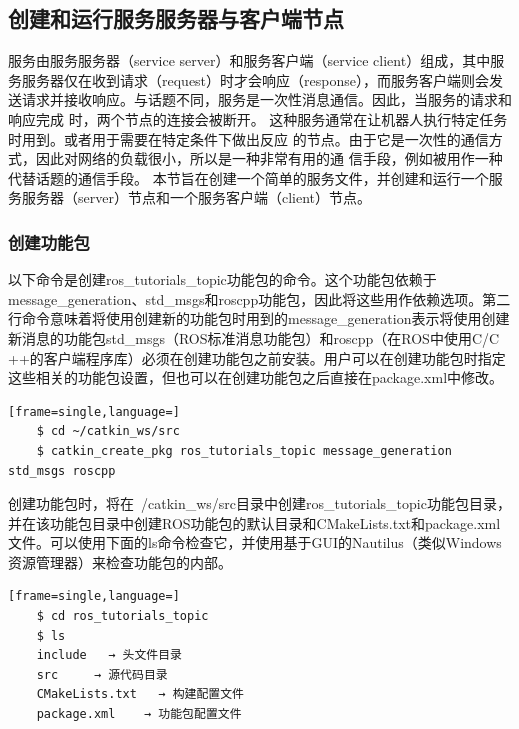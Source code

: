 \documentclass[geye,green,kindle,cn]{elegantnote}
\begin{document}
\subsection{创建和运行服务服务器与客户端节点}
服务由服务服务器（service server）和服务客户端（service client）组成，其中服务服务器仅在收到请求（request）时才会响应（response），而服务客户端则会发送请求并接收响应。与话题不同，服务是一次性消息通信。因此，当服务的请求和响应完成 时，两个节点的连接会被断开。 这种服务通常在让机器人执行特定任务时用到。或者用于需要在特定条件下做出反应 的节点。由于它是一次性的通信方式，因此对网络的负载很小，所以是一种非常有用的通 信手段，例如被用作一种代替话题的通信手段。 本节旨在创建一个简单的服务文件，并创建和运行一个服务服务器（server）节点和一个服务客户端（client）节点。
\subsubsection{创建功能包}
以下命令是创建ros\_tutorials\_topic功能包的命令。这个功能包依赖于message\_generation、std\_msgs和roscpp功能包，因此将这些用作依赖选项。第二行命令意味着将使用创建新的功能包时用到的message\_generation表示将使用创建新消息的功能包std\_msgs（ROS标准消息功能包）和roscpp（在ROS中使用C/C ++的客户端程序库）必须在创建功能包之前安装。用户可以在创建功能包时指定这些相关的功能包设置，但也可以在创建功能包之后直接在package.xml中修改。
\begin{lstlisting}[frame=single,language=]
    $ cd ~/catkin_ws/src 
    $ catkin_create_pkg ros_tutorials_topic message_generation std_msgs roscpp 
\end{lstlisting}

创建功能包时，将在~/catkin\_ws/src目录中创建ros\_tutorials\_topic功能包目录，并在该功能包目录中创建ROS功能包的默认目录和CMakeLists.txt和package.xml文件。可以使用下面的ls命令检查它，并使用基于GUI的Nautilus（类似Windows资源管理器）来检查功能包的内部。 
\begin{lstlisting}[frame=single,language=]
    $ cd ros_tutorials_topic 
    $ ls 
    include   → 头文件目录 
    src     → 源代码目录 
    CMakeLists.txt   → 构建配置文件 
    package.xml    → 功能包配置文件 
\end{lstlisting}
\end{document}
